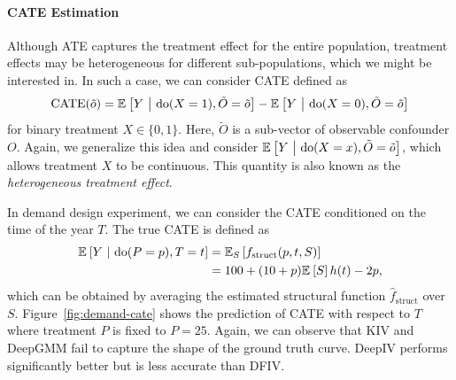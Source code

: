\paragraph{CATE Estimation} Although ATE captures the treatment effect for the entire population, treatment effects may be heterogeneous for different sub-populations, which we might be interested in. In such a case, we can consider CATE defined as
\begin{align*}
\mathrm{CATE}(\tilde o) = \expect{Y~\middle|~\mathrm{do}(X=1), \tilde O= \tilde o} - \expect{Y~\middle|~\mathrm{do}(X=0),\tilde O=\tilde o}
\end{align*}
for binary treatment $X\in\{0,1\}$. Here, $\tilde O$ is a sub-vector of observable confounder $O$. Again, we generalize this idea and consider $\expect{Y~\middle|~\mathrm{do}(X=x), \tilde O= \tilde o}$, which allows treatment $X$ to be continuous. This quantity is also known as  the \emph{heterogeneous treatment effect}.

In demand design experiment, we can consider the CATE conditioned on the time of the year $T$. The true CATE is defined as
\begin{align*}
    \expect{Y~\middle|~\mathrm{do}(P=p), T = t} &= \expect[S]{f_{\mathrm{struct}}(p, t, S)}\\
    &= 100 + (10+p) \expect{S} h(t) - 2p,
\end{align*}
which can be obtained by averaging the estimated structural function $\hat{f}_\mathrm{struct}$ over $S$. Figure~\ref{fig:demand-cate} shows the prediction of CATE with respect to $T$ where treatment $P$ is fixed to $P=25$. Again, we can observe that {KIV} and DeepGMM fail to capture the shape of the ground truth curve. DeepIV performs significantly better but is less accurate than DFIV.




